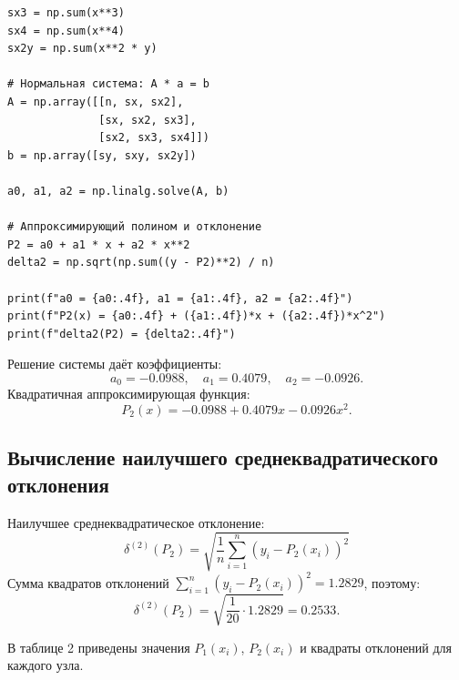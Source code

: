 \begin{lstlisting}[style=pythonstyle,caption={Квадратичная аппроксимация МНК}]
sx3 = np.sum(x**3)
sx4 = np.sum(x**4)
sx2y = np.sum(x**2 * y)

# Нормальная система: A * a = b
A = np.array([[n, sx, sx2],
              [sx, sx2, sx3],
              [sx2, sx3, sx4]])
b = np.array([sy, sxy, sx2y])

a0, a1, a2 = np.linalg.solve(A, b)

# Аппроксимирующий полином и отклонение
P2 = a0 + a1 * x + a2 * x**2
delta2 = np.sqrt(np.sum((y - P2)**2) / n)

print(f"a0 = {a0:.4f}, a1 = {a1:.4f}, a2 = {a2:.4f}")
print(f"P2(x) = {a0:.4f} + ({a1:.4f})*x + ({a2:.4f})*x^2")
print(f"delta2(P2) = {delta2:.4f}")
\end{lstlisting}

Решение системы даёт коэффициенты:
\[
a_0 = -0.0988, \quad a_1 = 0.4079, \quad a_2 = -0.0926.
\]
Квадратичная аппроксимирующая функция:
\[
P_2(x) = -0.0988 + 0.4079 x - 0.0926 x^2.
\]

\subsection{Вычисление наилучшего среднеквадратического отклонения}
Наилучшее среднеквадратическое отклонение:
\[
\delta^{(2)}(P_2) = \sqrt{\frac{1}{n} \sum_{i=1}^{n} (y_i - P_2(x_i))^2}
\]
Сумма квадратов отклонений $\sum_{i=1}^{n} (y_i - P_2(x_i))^2 = 1.2829$, поэтому:
\[
\delta^{(2)}(P_2) = \sqrt{\frac{1}{20} \cdot 1.2829} = 0.2533.
\]

В таблице 2 приведены значения $P_1(x_i)$, $P_2(x_i)$ и квадраты отклонений для каждого узла.

